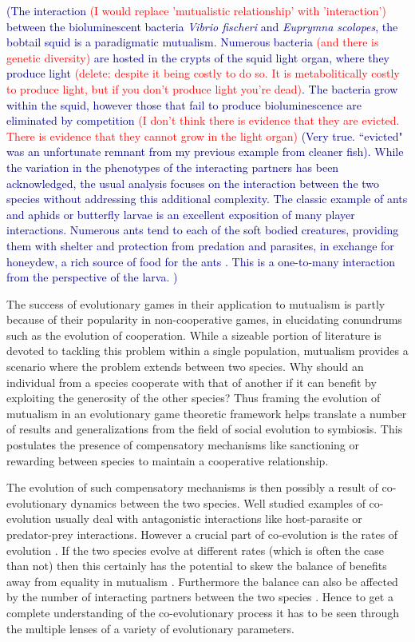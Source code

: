 \documentclass[12pt]{article}
\newcommand{\cha}[1]{\textcolor{darkblue}{(#1)}}
\newcommand{\paul}[1]{\textcolor{red}{(#1)}}
\begin{document}
\cha{The interaction \paul{I would replace 'mutualistic relationship' with 'interaction'} between the bioluminescent bacteria \textit{Vibrio fischeri} and \textit{Euprymna scolopes}, the bobtail squid \citep{mcfallngai:PLoSB:2014} is a paradigmatic mutualism. 
Numerous bacteria \paul{and there is genetic diversity} are hosted in the crypts of the squid light organ, where they produce light \paul{delete: despite it being costly to do so.  It is metabolitically costly to produce light, but if you don't produce light you're dead}. 
The bacteria grow within the squid, however those that fail to produce bioluminescence are eliminated by competition \citep{visick:JB:2000}
\paul{I don't think there is evidence that they are evicted.  There is evidence that they cannot grow in the light organ}
\cha{Very true. ``evicted" was an unfortunate remnant from my previous example from cleaner fish}. 
While the variation in the phenotypes of the interacting partners has been acknowledged, the usual analysis focuses on the interaction between the two species without addressing this additional complexity.
The classic example of ants and aphids or butterfly larvae \citep{pierce:BES:1987,hoelldobler:book:1990} is an excellent exposition of many player interactions. 
Numerous ants tend to each of the soft bodied creatures, providing them with shelter and protection from predation and parasites, in exchange for honeydew, a rich source of food for the ants \citep{hill:OEC:1989,stadler:book:2008}.
This is a one-to-many interaction from the perspective of the larva.
}

The success of evolutionary games in their application to mutualism is partly because of their popularity in non-cooperative games, in elucidating conundrums such as the evolution of cooperation.
While a sizeable portion of literature is devoted to tackling this problem within a single population, mutualism provides a scenario where the problem extends between two species.
Why should an individual from a species cooperate with that of another if it can benefit by exploiting the generosity of the other species?
Thus framing the evolution of mutualism in an evolutionary game theoretic framework helps translate a number of results and generalizations from the field of social evolution to symbiosis. 
This postulates the presence of compensatory mechanisms like sanctioning or rewarding between species to maintain a cooperative relationship.

The evolution of such compensatory mechanisms is then possibly a result of co-evolutionary dynamics between the two species.
Well studied examples of co-evolution usually deal with antagonistic interactions like host-parasite or predator-prey interactions.
However a crucial part of co-evolution is the rates of evolution \citep{salathe:TREE:2008}.
If the two species evolve at different rates (which is often the case than not) then this certainly has the potential to skew the balance of benefits away from equality in mutualism \citep{bergstrom:PNAS:2003}.
Furthermore the balance can also be affected by the number of interacting partners between the two species \citep{gokhale:PRSB:2012}.
Hence to get a complete understanding of the co-evolutionary process it has to be seen through the multiple lenses of a variety of evolutionary parameters.
\end{document}

